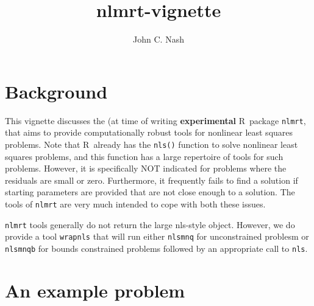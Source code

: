 \documentclass{article}
\title{nlmrt-vignette}
\author{John C. Nash}
\newcommand{\R}{{\sf R\ }}
\newcommand{\code}[1]{{\tt #1}}
\begin{document}
\maketitle



\section*{Background}

This vignette discusses the (at time of writing \textbf{experimental} 
\R package \code{nlmrt}, that aims to provide computationally robust
tools for nonlinear least squares problems. Note that \R already has the
\code{nls()} function to solve nonlinear least squares problems, and this
function has a large repertoire of tools for such problems. However, it is
specifically NOT indicated for problems where the residuals are small or
zero. Furthermore, it frequently fails to find a solution if starting 
parameters are provided that are not close enough to a solution. The tools
of \code{nlmrt} are very much intended to cope with both these issues.

\code{nlmrt} tools generally do not return the large nls-style object.
However, we do provide a tool \code{wrapnls} that will run either
\code{nlsmnq} for unconstrained problesm or \code{nlsmnqb} for bounds
constrained problems followed by an appropriate call to \code{nls}.


\section*{An example problem}
\end{document}
